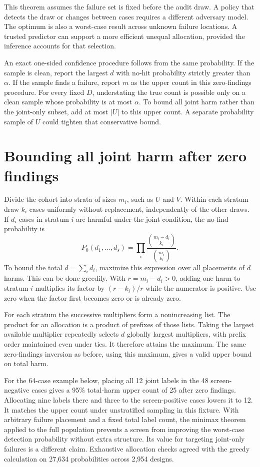 \documentclass[11pt]{article}
\begin{document}
This theorem assumes the failure set is fixed before the audit
draw. A policy that detects the draw or changes between cases
requires a different adversary model. The optimum is also a
worst-case result across unknown failure locations. A trusted
predictor can support a more efficient unequal allocation, provided
the inference accounts for that selection.

An exact one-sided confidence procedure follows from the same
probability. If the sample is clean, report the largest $d$
with no-hit probability strictly greater than $\alpha$. If the
sample finds a failure, report $m$ as the upper count in this
zero-findings procedure. For every fixed $D$, understating the
true count is possible only on a clean sample whose probability
is at most $\alpha$. To bound all joint harm rather than the
joint-only subset, add at most $|U|$ to this upper count. A separate
probability sample of $U$ could tighten that conservative bound.

\section{Bounding all joint harm after zero findings}
Divide the cohort into strata of sizes $m_i$, such as $U$ and $V$.
Within each stratum draw $k_i$ cases uniformly without replacement,
independently of the other draws. If $d_i$ cases in stratum $i$ are
harmful under the joint condition, the no-find probability is
\[
 P_0(d_1,\ldots,d_s)
  =\prod_i\frac{\binom{m_i-d_i}{k_i}}{\binom{m_i}{k_i}}.
\]
To bound the total $d=\sum_i d_i$, maximize this expression over
all placements of $d$ harms. This can be done greedily. With
$r=m_i-d_i>0$, adding one harm to stratum $i$ multiplies its factor
by $(r-k_i)/r$ while the numerator is positive. Use zero when the
factor first becomes zero or is already zero.

For each stratum the successive multipliers form a nonincreasing
list. The product for an allocation is a product of prefixes of
those lists. Taking the largest available multiplier repeatedly
selects $d$ globally largest multipliers, with prefix order
maintained even under ties. It therefore attains the maximum.
The same zero-findings inversion as before, using this maximum,
gives a valid upper bound on total harm.

For the 64-case example below, placing all 12 joint labels in the
48 screen-negative cases gives a 95\% total-harm upper count of
25 after zero findings. Allocating nine labels there and three to
the screen-positive cases lowers it to 12. It matches the upper
count under unstratified sampling in this fixture. With arbitrary
failure placement and a fixed total label count, the minimax
theorem applied to the full population prevents a screen from
improving the worst-case detection probability without extra
structure. Its value for targeting joint-only failures is a
different claim. Exhaustive allocation checks agreed with the
greedy calculation on 27,634 probabilities across 2,954 designs.
\end{document}
